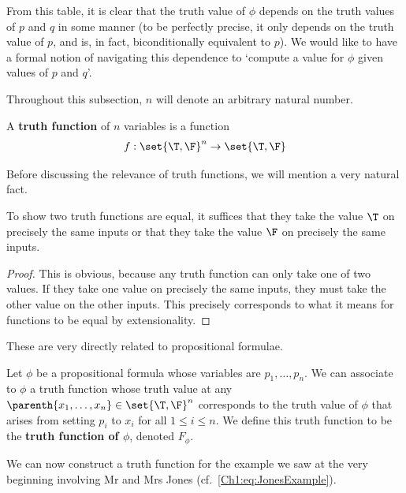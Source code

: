 From this table, it is clear that the truth value of $\phi$ depends on the truth values of $p$ and $q$ in some manner (to be perfectly precise, it only depends on the truth value of $p$, and is, in fact, biconditionally equivalent to $p$). We would like to have a formal notion of navigating this dependence to `compute a value for $\phi$ given values of $p$ and $q$'.

Throughout this subsection, $n$ will denote an arbitrary natural number.

\begin{boxdefinition}
    A \textbf{truth function} of $n$ variables is a function
    \begin{align*}
        f : \set{\T, \F}^n \to \set{\T, \F}
    \end{align*}
\end{boxdefinition}

Before discussing the relevance of truth functions, we will mention a very natural fact.

\begin{boxlemma}\label{Ch1:Lemma:TruthFunEq}
    To show two truth functions are equal, it suffices that they take the value $\T$ on precisely the same inputs or that they take the value $\F$ on precisely the same inputs.
\end{boxlemma}
\begin{proof}
    This is obvious, because any truth function can only take one of two values. If they take one value on precisely the same inputs, they must take the other value on the other inputs. This precisely corresponds to what it means for functions to be equal by extensionality.
\end{proof}

These are very directly related to propositional formulae.

\begin{boxdefinition}
    Let $\phi$ be a propositional formula whose variables are $p_1, \ldots, p_n$. We can associate to $\phi$ a truth function whose truth value at any $\parenth{x_1, \ldots, x_n} \in \set{\T, \F}^n$ corresponds to the truth value of $\phi$ that arises from setting $p_i$ to $x_i$ for all $1 \leq i \leq n$. We define this truth function to be the \textbf{truth function of $\phi$}, denoted $F_{\phi}$.
\end{boxdefinition}

We can now construct a truth function for the example we saw at the very beginning involving Mr and Mrs Jones (cf.~\eqref{Ch1:eq:JonesExample}).

